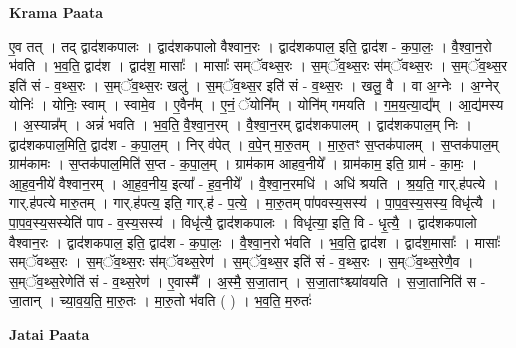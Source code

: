 \documentclass[17pt]{extarticle}
\begin{document}
\textbf{Krama Paata} \newline

ए॒व तत् । तद् द्वाद॑शकपालः । द्वाद॑शकपालो वैश्वान॒रः । द्वाद॑शकपाल॒ इति॒ द्वाद॑श - क॒पा॒लः॒ । वै॒श्वा॒न॒रो भ॑वति । भ॒व॒ति॒ द्वाद॑श । द्वाद॑श॒ मासाः᳚ । मासाः᳚ सम्ॅवथ्स॒रः । स॒म्ॅव॒थ्स॒रः स॑म्ॅवथ्स॒रः । स॒म्ॅव॒थ्स॒र इति॑ सं - व॒थ्स॒रः । स॒म्ॅव॒थ्स॒रः खलु॑ । स॒म्ॅव॒थ्स॒र इति॑ सं - व॒थ्स॒रः । खलु॒ वै । वा अ॒ग्नेः । अ॒ग्नेर् योनिः॑ । योनिः॒ स्वाम् । स्वामे॒व । ए॒वैन᳚म् । ए॒नं॒ ॅयोनि᳚म् । योनि॑म् गमयति । ग॒म॒य॒त्या॒द्य᳚म् । आ॒द्य॑मस्य । अ॒स्यान्न᳚म् । अन्नं॑ भवति । भ॒व॒ति॒ वै॒श्वा॒न॒रम् । वै॒श्वा॒न॒रम् द्वाद॑शकपालम् । द्वाद॑शकपाल॒म् निः । द्वाद॑शकपाल॒मिति॒ द्वाद॑श - क॒पा॒ल॒म् । निर् व॑पेत् । व॒पे॒न् मा॒रु॒तम् । मा॒रु॒तꣳ स॒प्तक॑पालम् । स॒प्तक॑पाल॒म् ग्राम॑कामः । स॒प्तक॑पाल॒मिति॑ स॒प्त - क॒पा॒ल॒म् । ग्राम॑काम आहव॒नीये᳚ । ग्राम॑काम॒ इति॒ ग्राम॑ - का॒मः॒ । आ॒ह॒व॒नीये॑ वैश्वान॒रम् । आ॒ह॒व॒नीय॒ इत्या᳚ - ह॒व॒नीये᳚ । वै॒श्वा॒न॒रमधि॑ । अधि॑ श्रयति । श्र॒य॒ति॒ गार्.ह॑पत्ये । गार्.ह॑पत्ये मारु॒तम् । गार्.ह॑पत्य॒ इति॒ गार्.ह॑ - प॒त्ये॒ । मा॒रु॒तम् पा॑पवस्य॒सस्य॑ । पा॒प॒व॒स्य॒सस्य॒ विधृ॑त्यै । पा॒प॒व॒स्य॒सस्येति॑ पाप - व॒स्य॒सस्य॑ । विधृ॑त्यै॒ द्वाद॑शकपालः । विधृ॑त्या॒ इति॒ वि - धृ॒त्यै॒ । द्वाद॑शकपालो वैश्वान॒रः । द्वाद॑शकपाल॒ इति॒ द्वाद॑श - क॒पा॒लः॒ । वै॒श्वा॒न॒रो भ॑वति । भ॒व॒ति॒ द्वाद॑श । द्वाद॑श॒मासाः᳚ । मासाः᳚ सम्ॅवथ्स॒रः । स॒म्ॅव॒थ्स॒रः स॑म्ॅवथ्स॒रेण॑ । स॒म्ॅव॒थ्स॒र इति॑ सं - व॒थ्स॒रः । स॒म्ॅव॒थ्स॒रेणै॒व । स॒म्ॅव॒थ्स॒रेणेति॑ सं - व॒थ्स॒रेण॑ । ए॒वास्मै᳚ । अ॒स्मै॒ स॒जा॒तान् । स॒जा॒ताꣳश्च्या॑वयति । स॒जा॒तानिति॑ स - जा॒तान् । च्या॒व॒य॒ति॒ मा॒रु॒तः । मा॒रु॒तो भ॑वति ( ) । भ॒व॒ति॒ म॒रुतः॑ \newline

\textbf{Jatai Paata} \newline
\end{document}
